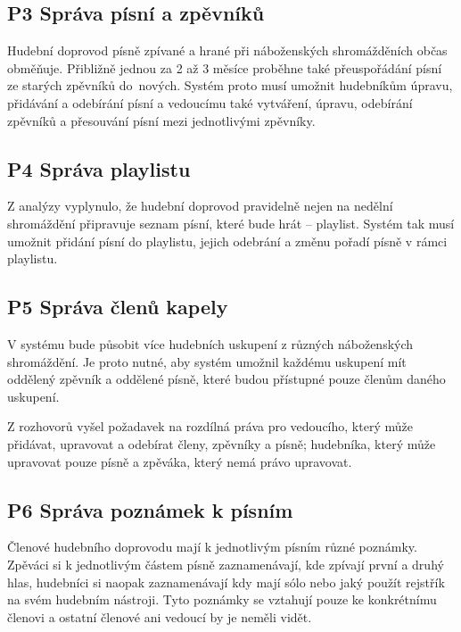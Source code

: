 \subsection{P3 Správa písní a zpěvníků}
\label{sprava-pisni-zpevniku}

Hudební doprovod písně zpívané a hrané při náboženských shromážděních občas obměňuje. Přibližně jednou za 2 až 3 měsíce proběhne také přeuspořádání písní ze starých zpěvníků do~no\-vých. Systém proto musí umožnit hudebníkům úpravu, přidávání a odebírání písní a vedoucímu také vytváření, úpravu, odebírání zpěvníků a přesouvání písní mezi jednotlivými zpěvníky.

\subsection{P4 Správa playlistu}
\label{sprava-playlistu}

Z analýzy vyplynulo, že hudební doprovod pravidelně nejen na nedělní shromáždění připravuje seznam písní, které bude hrát -- playlist. Systém tak musí umožnit přidání písní do playlistu, jejich odebrání a změnu pořadí písně v rámci playlistu.

\subsection{P5 Správa členů kapely}
\label{sprava-clenu-kapely}

V systému bude působit více hudebních uskupení z různých náboženských shromáždění. Je proto nutné, aby systém umožnil každému uskupení mít oddělený zpěvník a oddělené písně, které budou přístupné pouze členům daného uskupení.

Z rozhovorů vyšel požadavek na rozdílná práva pro vedoucího, který může přidávat, upravovat a odebírat členy, zpěvníky a písně; hudebníka, který může upravovat pouze písně a zpěváka, který nemá právo upravovat.

\subsection{P6 Správa poznámek k písním}
\label{sprava-poznamek}

Členové hudebního doprovodu mají k jednotlivým písním různé poznámky. Zpěváci si k jednotlivým částem písně zaznamenávají, kde zpívají první a druhý hlas, hudebníci si naopak zaznamenávají kdy mají sólo nebo jaký použít rejstřík na svém hudebním nástroji. Tyto poznámky se vztahují pouze ke konkrétnímu členovi a ostatní členové ani vedoucí by je neměli vidět.

